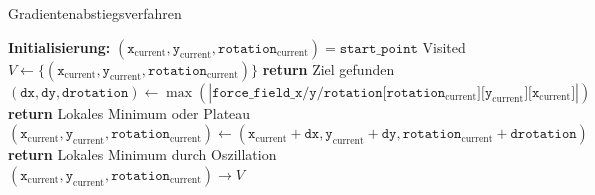 \begin{algorithm}
\caption{Gradientenabstiegsverfahren}
\begin{algorithmic}[1]
    \State \textbf{Initialisierung:}
    \State \hspace{\algorithmicindent} $(\texttt{x}_{\text{current}}, \texttt{y}_{\text{current}}, \texttt{rotation}_{\text{current}}) = \texttt{start\_point}$
    \State \hspace{\algorithmicindent} Visited $V \leftarrow \{(\texttt{x}_{\text{current}}, \texttt{y}_{\text{current}}, \texttt{rotation}_{\text{current}})\}$
	\vspace*{0.3cm}
            \State \textbf{return} Ziel gefunden
        \EndIf
		\vspace*{0.1cm}
        \State $(\texttt{dx}, \texttt{dy}, \texttt{drotation}) \gets \max(|\texttt{force\_field\_x/y/rotation}\texttt{[}\texttt{rotation}_{\text{current}}\texttt{][}\texttt{y}_{\text{current}}\texttt{][}\texttt{x}_{\text{current}}\texttt{]}|)$
		\vspace*{-0.3cm}
            \State \textbf{return} Lokales Minimum oder Plateau
        \EndIf
     	\vspace*{0.1cm}
        \State $(\texttt{x}_{\text{current}}, \texttt{y}_{\text{current}}, \texttt{rotation}_{\text{current}}) \gets (\texttt{x}_{\text{current}} + \texttt{dx}, \texttt{y}_{\text{current}} + \texttt{dy}, \texttt{rotation}_{\text{current}} + \texttt{drotation})$
		\vspace*{-0.3cm}
            \State \textbf{return} Lokales Minimum durch Oszillation
		\Else
			\State $(\texttt{x}_{\text{current}}, \texttt{y}_{\text{current}}, \texttt{rotation}_{\text{current}}) \rightarrow V$
        \EndIf
    \EndWhile
\end{algorithmic}
\end{algorithm}

